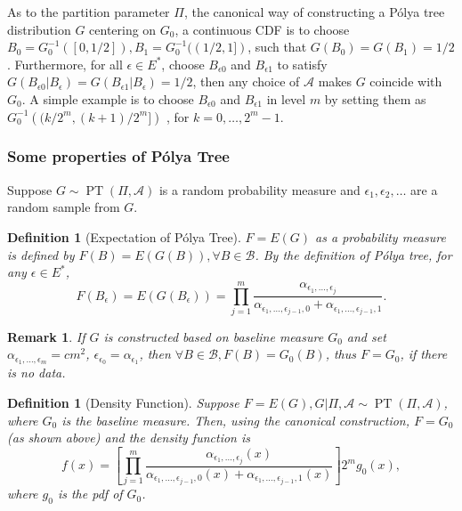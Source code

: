 \documentclass[12pt]{article}
\newtheorem{deff}[thm]{Definition}
\newtheorem{rmk}[thm]{Remark}
\newcommand{\polya}{P\'{o}lya}
\DeclareMathOperator{\pt}{PT}
\begin{document}
As to the partition parameter $\Pi$, the canonical way of constructing
a \polya{} tree distribution $G$ centering on $G_0$, a continuous CDF
is to choose $B_0 = G^{-1}_0 ([0, 1/2]), B_1 = G^{-1}_0 ((1/2,1])$,
such that $G(B_0) = G(B_1)= 1/2$. Furthermore, for all $\epsilon \in
E^{*}$, choose $B_{\epsilon 0 }$ and $B_{\epsilon 1}$ to satisfy 
$G(B_{\epsilon 0 } |B_{\epsilon} ) = G(B_{\epsilon 1} | B_{\epsilon})
= 1/2 $, then any choice of $\mathcal{A} $ makes $G$ coincide with
$G_0$. A simple example is to choose $B_{\epsilon 0} $ and
$B_{\epsilon 1}$ in level $m$ by setting them as $G^{-1}_0 \left(
  (k/2^m, (k+1)/2^m] \right)$ , for $k=0, \ldots, 2^m-1$. 

\subsubsection{Some properties of \polya{} Tree}
Suppose $G \sim \pt (\Pi, \mathcal{A})$ is a random probability
measure and $\epsilon_1, \epsilon_2, \ldots$ are a random sample from $G$. 

\begin{deff}[Expectation of \polya{} Tree]
  $F= E(G)$ as a probability measure is defined by $F(B) = E(G(B)),
  \forall B \in \mathcal{B}$. By the definition of \polya{} tree, for any
  $\epsilon \in E^{*}$, 
  \begin{displaymath}
    F(B_{\epsilon})  = E(G(B_{\epsilon})) = \prod_{j=1}^m
    \frac{\alpha_{\epsilon_1, \ldots, \epsilon_j}}{\alpha_{\epsilon_1,
        \ldots, \epsilon_{j-1},0} + \alpha_{\epsilon_1, \ldots, \epsilon_{j-1},1}}.
  \end{displaymath}
\end{deff}

\begin{rmk}
  If $G$ is constructed based on baseline measure $G_0$ and set
  $\alpha_{\epsilon_1, \ldots, \epsilon_m} = cm^2 $,
  $\epsilon_{\epsilon_0 }= \alpha_{\epsilon_1}$, then $\forall B \in
  \mathcal{B}, F(B) = G_0(B)$, thus $F=G_0$, if there is no
  data.
\end{rmk}

\begin{deff}[Density Function]
  Suppose $F=E(G), G|\Pi, \mathcal{A} \sim \pt (\Pi, \mathcal{A})$,
  where $G_0 $ is the baseline measure. Then, using the canonical
  construction, $F=G_0$ (as shown above) and the density function is 
  \begin{equation}\label{eq:3}
    f(x) = \left[ \prod_{j=1}^m \frac{ \alpha_{\epsilon_1, \ldots,
          \epsilon_j}(x)}{\alpha_{\epsilon_1, \ldots, \epsilon_{j-1},0}(x)
        + \alpha_{\epsilon_1, \ldots, \epsilon_{j-1},1}(x)} \right] 2^{m } g_0(x),
  \end{equation}
  where $g_0$ is the pdf of $G_0$. 
\end{deff}
\end{document}

